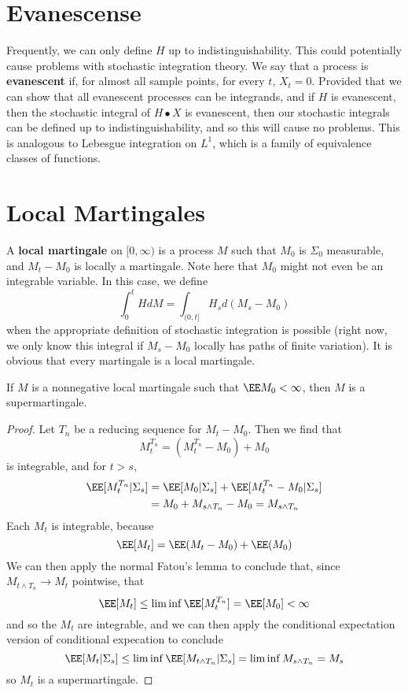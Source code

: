 \section{Evanescense}

Frequently, we can only define $H$ up to indistinguishability. This could potentially cause problems with stochastic integration theory. We say that a process is {\bf evanescent} if, for almost all sample points, for every $t$, $X_t = 0$. Provided that we can show that all evanescent processes can be integrands, and if $H$ is evanescent, then the stochastic integral of $H \bullet X$ is evanescent, then our stochastic integrals can be defined up to indistinguishability, and so this will cause no problems. This is analogous to Lebesgue integration on $L^1$, which is a family of equivalence classes of functions.

\section{Local Martingales}

A {\bf local martingale} on $[0,\infty)$ is a process $M$ such that $M_0$ is $\Sigma_0$ measurable, and $M_t - M_0$ is locally a martingale. Note here that $M_0$ might not even be an integrable variable. In this case, we define
%
\[ \int_0^t H dM = \int_{(0,t]} H_s d(M_s - M_0) \]
%
when the appropriate definition of stochastic integration is possible (right now, we only know this integral if $M_s - M_0$ locally has paths of finite variation). It is obvious that every martingale is a local martingale.

\begin{lemma}
    If $M$ is a nonnegative local martingale such that $\EE M_0 < \infty$, then $M$ is a supermartingale.
\end{lemma}
\begin{proof}
    Let $T_n$ be a reducing sequence for $M_t - M_0$. Then we find that
    \[ M^{T_n}_t = (M^{T_n}_t - M_0) + M_0 \]
    is integrable, and for $t > s$,
    \begin{align*}
        \EE[M^{T_n}_t | \Sigma_s] &= \EE[M_0 | \Sigma_s] + \EE[ M^{T_n}_t - M_0 | \Sigma_s ]\\
        &= M_0 + M_{s \wedge T_n} - M_0 = M_{s \wedge T_n}
    \end{align*}
    Each $M_t$ is integrable, because
    \[ \EE[M_t] = \EE(M_t - M_0) + \EE(M_0) \]
    We can then apply the normal Fatou's lemma to conclude that, since $M_{t \wedge T_n} \to M_t$ pointwise, that
    \[ \EE[M_t] \leq \liminf \EE[M_t^{T_n}] = \EE[M_0] < \infty \]
    and so the $M_t$ are integrable, and we can then apply the conditional expectation version of conditional expecation to conclude
    \[ \EE[M_t | \Sigma_s ] \leq \liminf \EE[M_{t \wedge T_n} | \Sigma_s] = \liminf M_{s \wedge T_n} = M_s \]
    so $M_t$ is a supermartingale.
\end{proof}

